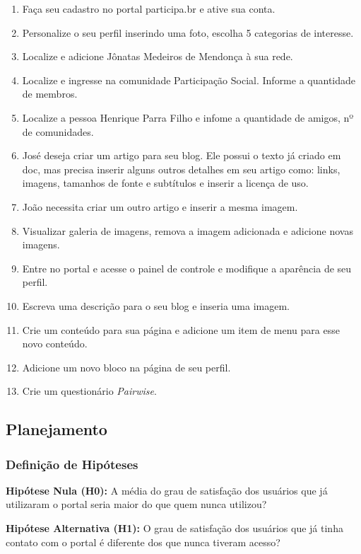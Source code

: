 \begin{enumerate}
	\item Faça seu cadastro no portal participa.br e ative sua conta.
	\item Personalize o seu perfil inserindo uma foto, escolha 5 categorias de interesse.
	\item Localize e adicione Jônatas Medeiros de Mendonça à sua rede.
	\item Localize e ingresse na comunidade Participação Social. Informe a quantidade de membros.
	\item Localize a pessoa Henrique Parra Filho e infome a quantidade de amigos, nº de comunidades.
	\item José deseja criar um artigo para seu blog. Ele possui o texto já criado em doc, mas precisa inserir alguns outros detalhes em seu artigo como: links, imagens, tamanhos de fonte e subtítulos e inserir a licença de uso.
	\item João necessita criar um outro artigo e inserir a mesma imagem.
	\item Visualizar galeria de imagens, remova a imagem adicionada e adicione novas imagens.
	\item Entre no portal e acesse o painel de controle e modifique a aparência de seu perfil.
	\item Escreva uma descrição para o seu blog e inseria uma imagem.
	\item Crie um conteúdo para sua página e adicione um item de menu para esse novo conteúdo.
	\item Adicione um novo bloco na página de seu perfil.
	\item Crie um questionário \textit{Pairwise}.
\end{enumerate}

\subsection{Planejamento}

\subsubsection{Definição de Hipóteses}

\textbf{Hipótese Nula (H0):} A média do grau de satisfação dos usuários que já utilizaram o portal seria maior do que quem nunca utilizou?

\textbf{Hipótese Alternativa (H1):} O grau de satisfação dos usuários que já tinha contato com o portal é diferente dos que nunca tiveram acesso?

